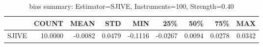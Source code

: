 \begin{table}[ht]
\centering
\caption{bias summary: Estimator=SJIVE, Instruments=100, Strength=0.40}
\begin{tabular}{lrrrrrrrr}
\toprule
 & COUNT & MEAN & STD & MIN & 25\% & 50\% & 75\% & MAX \\
\midrule
SJIVE & 10.0000 & -0.0082 & 0.0479 & -0.1116 & -0.0267 & 0.0094 & 0.0278 & 0.0342 \\
\bottomrule
\end{tabular}
\end{table}
